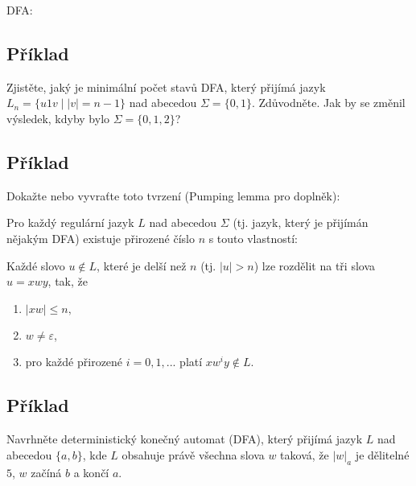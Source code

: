 DFA: 





\subsection{Příklad}
Zjistěte, jaký je minimální počet stavů DFA, který přijímá jazyk $L_n = \{u1v \mid |v|=n-1\}$ nad abecedou 
$\Sigma = \{0,1\}$. Zdůvodněte. Jak by se změnil výsledek, kdyby bylo $\Sigma = \{0,1,2\}$?

\subsection{Příklad}
Dokažte nebo vyvraťte toto tvrzení (Pumping lemma pro doplněk):

Pro každý regulární jazyk $L$ nad abecedou $\Sigma$ (tj. jazyk, který je přijímán nějakým DFA) existuje přirozené číslo 
$n$ s touto vlastností:

Každé slovo $u \not\in L$, které je delší než $n$ (tj. $|u| > n$) lze rozdělit na tři slova $u =xwy$, tak, že
\begin{enumerate}[noitemsep]
    \item $|xw| \leq n,$
    \item $w \not= \varepsilon$,
    \item pro každé přirozené $i = 0, 1, ...$ platí $xw^iy \not\in L$.
\end{enumerate}

\subsection{Příklad}
Navrhněte deterministický konečný automat (DFA), který přijímá jazyk $L$ nad abecedou $\{a,b\}$, kde $L$ obsahuje právě 
všechna slova $w$ taková, že $|w|_a$ je dělitelné $5$, $w$ začíná $b$ a končí $a$.

